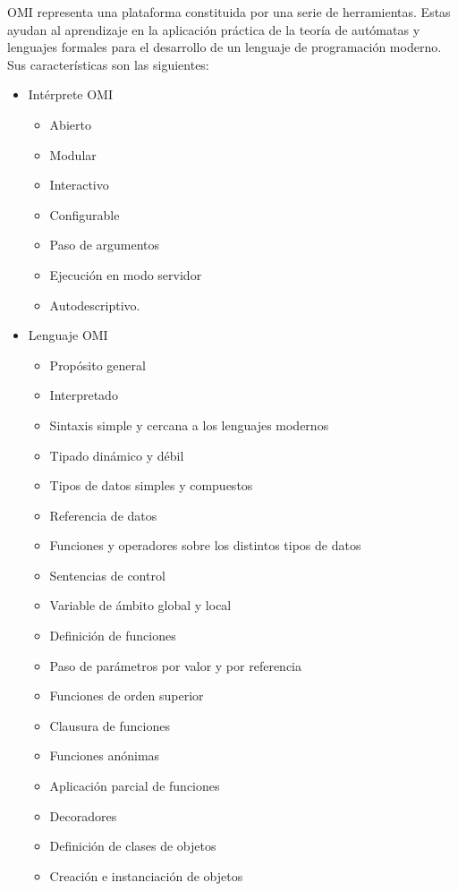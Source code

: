 OMI representa una plataforma constituida por una serie de herramientas. Estas ayudan al aprendizaje en la aplicación práctica de la teoría
de autómatas y lenguajes formales para el desarrollo de un lenguaje de programación moderno. Sus características son las siguientes:

\begin{itemize}
   \item Intérprete OMI
   \begin {itemize}
      \item Abierto
      \item Modular
      \item Interactivo
      \item Configurable
      \item Paso de argumentos
      \item Ejecución en modo servidor
      \item Autodescriptivo.
   \end{itemize}
   \item Lenguaje OMI
   \begin {itemize}
      \item Propósito general
      \item Interpretado
      \item Sintaxis simple y cercana a los lenguajes modernos
      \item Tipado dinámico y débil
      \item Tipos de datos simples y compuestos
      \item Referencia de datos
      \item Funciones y operadores sobre los distintos tipos de datos
      \item Sentencias de control 
      \item Variable de ámbito global y local
      \item Definición de funciones
      \item Paso de parámetros por valor y por referencia
      \item Funciones de orden superior
      \item Clausura de funciones
      \item Funciones anónimas
      \item Aplicación parcial de funciones
      \item Decoradores
      \item Definición de clases de objetos
      \item Creación e instanciación de objetos

\end{itemize}
\end{itemize}
